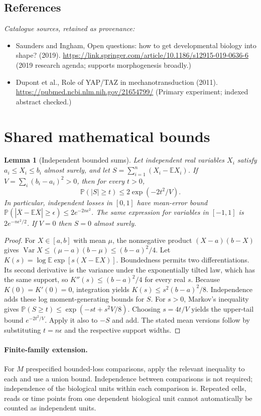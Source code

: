 \documentclass[11pt]{article}
\newcommand{\E}{\mathbb E}
\newcommand{\Prob}{\mathbb P}
\DeclareMathOperator{\Var}{Var}
\providecommand{\E}{\mathbb E}
\providecommand{\Prob}{\mathbb P}
\providecommand{\Var}{\operatorname{Var}}
\newtheorem{sharedlemma}{Lemma}[section]
\begin{document}
\subsection{References}
\noindent\emph{Catalogue sources, retained as provenance:}
\begin{itemize}
\item Saunders and Ingham, Open questions: how to get developmental biology into shape? (2019). \url{https://link.springer.com/article/10.1186/s12915-019-0636-6} (2019 research agenda; supports morphogenesis broadly.)
\item Dupont et al., Role of YAP/TAZ in mechanotransduction (2011). \url{https://pubmed.ncbi.nlm.nih.gov/21654799/} (Primary experiment; indexed abstract checked.)
\end{itemize}
\clearpage


\appendix
\section{Shared mathematical bounds}\label{app:bounds}
\begin{sharedlemma}[Independent bounded sums]\label{lem:bounded}
Let independent real variables $X_i$ satisfy $a_i\leq X_i\leq b_i$ almost surely,
and let $S=\sum_{i=1}^n(X_i-\E X_i)$. If
$V=\sum_i(b_i-a_i)^2>0$, then for every $t>0$,
\[
 \Prob(|S|\geq t)\leq 2\exp(-2t^2/V).
\]
In particular, independent losses in $[0,1]$ have mean-error bound
$\Prob(|\overline X-\E\overline X|\geq\epsilon)
\leq2e^{-2n\epsilon^2}$. The same expression for variables in $[-1,1]$
is $2e^{-n\epsilon^2/2}$. If $V=0$ then $S=0$ almost surely.
\end{sharedlemma}
\begin{proof}
For $X\in[a,b]$ with mean $\mu$, the nonnegative product
$(X-a)(b-X)$ gives
$\Var X\leq(\mu-a)(b-\mu)\leq(b-a)^2/4$.
Let $K(s)=\log\E\exp[s(X-\E X)]$.
Boundedness permits two differentiations. Its second derivative is the variance
under the exponentially tilted law, which has the same support, so
$K''(s)\leq(b-a)^2/4$ for every real $s$.
Because $K(0)=K'(0)=0$, integration yields
$K(s)\leq s^2(b-a)^2/8$.
Independence adds these log moment-generating bounds for $S$.
For $s>0$, Markov's inequality gives
$\Prob(S\geq t)\leq\exp(-st+s^2V/8)$.
Choosing $s=4t/V$ yields the upper-tail bound $e^{-2t^2/V}$.
Apply it also to $-S$ and add. The stated mean versions follow by substituting
$t=n\epsilon$ and the respective support widths.
\end{proof}

\paragraph{Finite-family extension.}
For $M$ prespecified bounded-loss comparisons, apply the relevant inequality to
each and use a union bound. Independence between comparisons is not required;
independence of the biological units within each comparison is. Repeated cells,
reads or time points from one dependent biological unit cannot automatically be
counted as independent units.
\end{document}
